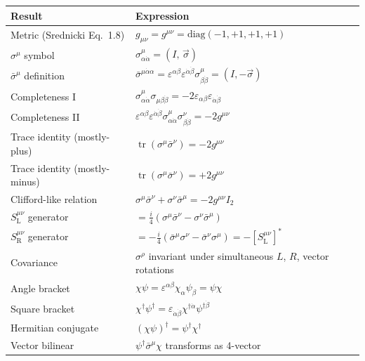 \begin{center}
\renewcommand{\arraystretch}{1.5}
\begin{tabular}{@{}p{5.5cm}p{8cm}@{}}
  \toprule
  Result & Expression \\
  \midrule
  Metric (Srednicki Eq.~1.8) & $g_{\mu\nu} = g^{\mu\nu} = \mathrm{diag}(-1,+1,+1,+1)$ \\[2pt]
  $\sigma^\mu$ symbol & $\sigma^\mu_{\alpha\dot\alpha} = (I,\,\vec\sigma)$ \\[2pt]
  $\bar\sigma^\mu$ definition & $\bar\sigma^{\mu\dot\alpha\alpha}
    = \varepsilon^{\alpha\beta}\varepsilon^{\dot\alpha\dot\beta}\sigma^\mu_{\beta\dot\beta}
    = (I,-\vec\sigma)$ \quad [35.19] \\[2pt]
  Completeness I \quad [35.4] &
    $\sigma^\mu_{\alpha\dot\alpha}\sigma_{\mu\beta\dot\beta}
     = -2\varepsilon_{\alpha\beta}\varepsilon_{\dot\alpha\dot\beta}$ \\[2pt]
  Completeness II \quad [35.5] &
    $\varepsilon^{\alpha\beta}\varepsilon^{\dot\alpha\dot\beta}
     \sigma^\mu_{\alpha\dot\alpha}\sigma^\nu_{\beta\dot\beta} = -2g^{\mu\nu}$ \\[2pt]
  Trace identity (mostly-plus) &
    $\operatorname{tr}(\sigma^\mu\bar\sigma^\nu) = -2g^{\mu\nu}$ \\[2pt]
  Trace identity (mostly-minus) &
    $\operatorname{tr}(\sigma^\mu\bar\sigma^\nu) = +2g^{\mu\nu}$  \\[2pt]
  Clifford-like relation &
    $\sigma^\mu\bar\sigma^\nu + \sigma^\nu\bar\sigma^\mu = -2g^{\mu\nu}I_2$ \\[2pt]
  $S^{\mu\nu}_{\mathrm{L}}$ generator \quad [35.21] &
    $= \tfrac{i}{4}(\sigma^\mu\bar\sigma^\nu - \sigma^\nu\bar\sigma^\mu)$ \\[2pt]
  $S^{\mu\nu}_{\mathrm{R}}$ generator \quad [35.22] &
    $= -\tfrac{i}{4}(\bar\sigma^\mu\sigma^\nu - \bar\sigma^\nu\sigma^\mu)
     = -[S^{\mu\nu}_{\mathrm{L}}]^*$ \\[2pt]
  Covariance \quad [35.14] &
    $\sigma^\rho$ invariant under simultaneous $L$, $R$, vector rotations \\[2pt]
  Angle bracket &
    $\chi\psi = \varepsilon^{\alpha\beta}\chi_\alpha\psi_\beta = \psi\chi$
    \quad [35.23, 35.25] \\[2pt]
  Square bracket &
    $\chi^\dagger\psi^\dagger
     = \varepsilon_{\dot\alpha\dot\beta}\chi^{\dagger\dot\alpha}\psi^{\dagger\dot\beta}$
    \quad [35.23] \\[2pt]
  Hermitian conjugate &
    $(\chi\psi)^\dagger = \psi^\dagger\chi^\dagger$ \quad [35.26] \\[2pt]
  Vector bilinear &
    $\psi^\dagger\bar\sigma^\mu\chi$ transforms as 4-vector \quad [35.28] \\[2pt]
  \bottomrule
\end{tabular}
\end{center}

